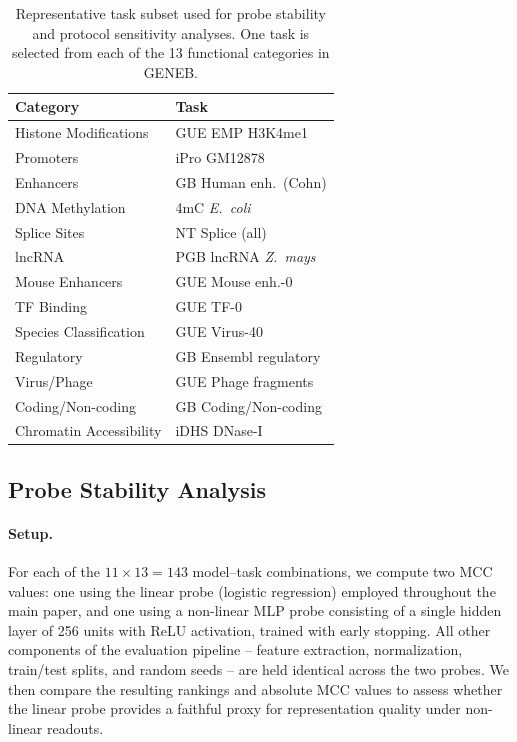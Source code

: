 \documentclass{article}
\theoremstyle{plain}
\theoremstyle{definition}
\theoremstyle{remark}
\begin{document}
\begin{table}[h]
\centering
\caption{Representative task subset used for probe stability and protocol
sensitivity analyses. One task is selected from each of the 13 functional
categories in GENEB.}
\label{tab:stability_tasks_unique}
\small
\begin{tabular}{@{}ll@{}}
\toprule
\textbf{Category} & \textbf{Task} \\
\midrule
Histone Modifications     & GUE EMP H3K4me1 \\
Promoters                 & iPro GM12878 \\
Enhancers                 & GB Human enh.\ (Cohn) \\
DNA Methylation           & 4mC \emph{E.\ coli} \\
Splice Sites              & NT Splice (all) \\
lncRNA                    & PGB lncRNA \emph{Z.\ mays} \\
Mouse Enhancers           & GUE Mouse enh.-0 \\
TF Binding                & GUE TF-0 \\
Species Classification    & GUE Virus-40 \\
Regulatory                & GB Ensembl regulatory \\
Virus/Phage               & GUE Phage fragments \\
Coding/Non-coding         & GB Coding/Non-coding \\
Chromatin Accessibility   & iDHS DNase-I \\
\bottomrule
\end{tabular}
\end{table}

\subsection{Probe Stability Analysis}
\label{subsec:probe_stability}

\paragraph{Setup.}
For each of the $11 \times 13 = 143$ model--task combinations, we compute
two MCC values: one using the linear probe (logistic regression) employed
throughout the main paper, and one using a non-linear MLP probe consisting
of a single hidden layer of 256 units with ReLU activation, trained with
early stopping. All other components of the evaluation pipeline -- feature
extraction, normalization, train/test splits, and random seeds -- are held
identical across the two probes. We then compare the resulting rankings
and absolute MCC values to assess whether the linear probe provides a
faithful proxy for representation quality under non-linear readouts.
\end{document}
